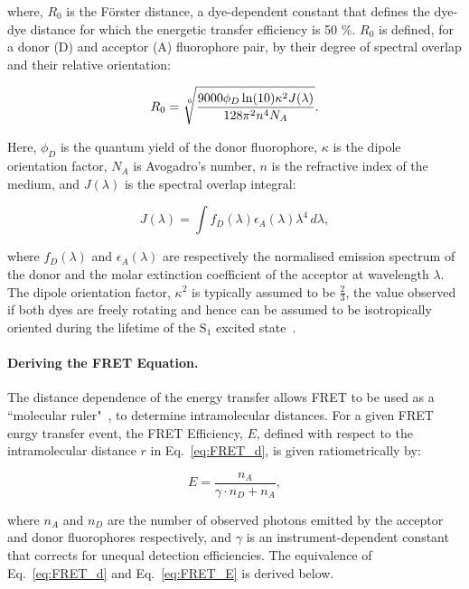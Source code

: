 where, $R_0$ is the F\"{o}rster distance, a dye-dependent constant that defines the dye-dye distance for which the energetic transfer efficiency is 50 \%. $R_0$ is defined, for a donor (D) and acceptor (A) fluorophore pair, by their degree of spectral overlap and their relative orientation:

\begin{equation}
R_0 = \sqrt[\leftroot{-2}\uproot{2}6]{\frac{9000\phi_D\ln(10)\kappa^2J(\lambda)}{128\pi^2n^4N_A}}.
\label{eq:R_0}
\end{equation}

Here, $\phi_D$ is the quantum yield of the donor fluorophore, $\kappa$ is the dipole orientation factor, $N_A$ is Avogadro's number, $n$ is the refractive index of the medium, and $J(\lambda)$ is the spectral overlap integral:

\begin{equation}
J(\lambda) = \int f_D(\lambda)\epsilon_A(\lambda)\lambda^4\,d\lambda,
\label{eq:J}
\end{equation}

where $f_D(\lambda)$ and $\epsilon_A(\lambda)$ are respectively the normalised emission spectrum of the donor and the molar extinction coefficient of the acceptor at wavelength $\lambda$. The dipole orientation factor, $\kappa^2$ is typically assumed to be $\frac{2}{3}$, the value observed if both dyes are freely rotating and hence can be assumed to be isotropically oriented during the lifetime of the $\text{S}_1$ excited state~\cite{Demchenko2008}.

\paragraph{Deriving the FRET Equation.}
The distance dependence of the energy transfer allows FRET to be used as a ``molecular ruler"~\cite{stryer67}, to determine intramolecular distances. For a given FRET enrgy transfer event, the FRET Efficiency, $E$, defined with respect to the intramolecular distance $r$ in Eq.~\ref{eq:FRET_d}, is given ratiometrically by:

\begin{equation}
E = \frac{n_A}{\gamma \cdot n_D + n_A},
\label{eq:FRET_E}
\end{equation}

where $n_A$ and $n_D$ are the number of observed photons emitted by the acceptor and donor fluorophores respectively, and $\gamma$ is an instrument-dependent constant that corrects for unequal detection efficiencies. The equivalence of Eq.~\ref{eq:FRET_d} and Eq.~\ref{eq:FRET_E} is derived below.

